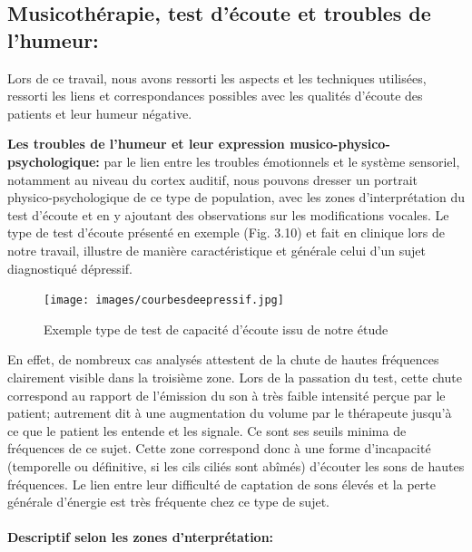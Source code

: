 \subsection{Musicothérapie, test d'écoute et troubles de l'humeur:}
Lors de ce travail, nous avons ressorti les aspects 
et  les techniques utilisées, ressorti  les liens et 
correspondances possibles avec les qualités d'écoute des patients et leur humeur 
négative.  %

\textbf{Les troubles de l'humeur et leur expression
	musico-phy\-sico-psy\-cho\-lo\-gi\-que:} par le lien entre les troubles
émotionnels et le
système sensoriel, notamment au niveau du cortex auditif, nous
pouvons dresser un portrait 
physico-psychologique de ce type de population,
 avec les zones d'interprétation du test d'écoute %
et en y ajoutant des observations sur les modifications vocales.
Le type de test d'écoute présenté en exemple (Fig. 3.10) et fait en clinique lors de notre travail,  illustre de 
manière 
caractéristique 
et générale  
celui d'un sujet diagnostiqué dépressif.
\begin{figure}[ht]
	\centering
	\texttt{[image: images/courbesdeepressif.jpg]}
	\caption{Exemple type de test de capacité d'écoute issu de notre étude }
	\label{fig:courbes du dépressif}
\end{figure}


En effet, de nombreux cas analysés attestent de la 
chute de hautes fréquences 
clairement visible dans la troisième zone. Lors de la passation du test, cette chute correspond au rapport 
de 
l'émission du son à
très faible intensité perçue par le
patient;  autrement dit à une augmentation
du volume
par le thérapeute jusqu'à ce que le patient les entende et les signale.
Ce sont ses seuils minima de fréquences de ce sujet.
Cette zone correspond donc à une forme d'incapacité (temporelle ou définitive, si les cils ciliés sont 
abîmés) d'écouter les sons de 
hautes fréquences. Le lien entre leur 
difficulté de captation de sons élevés et  la perte générale d'énergie est très 
fréquente chez ce type de sujet. %



\paragraph{Descriptif selon les zones d'nterprétation:}

